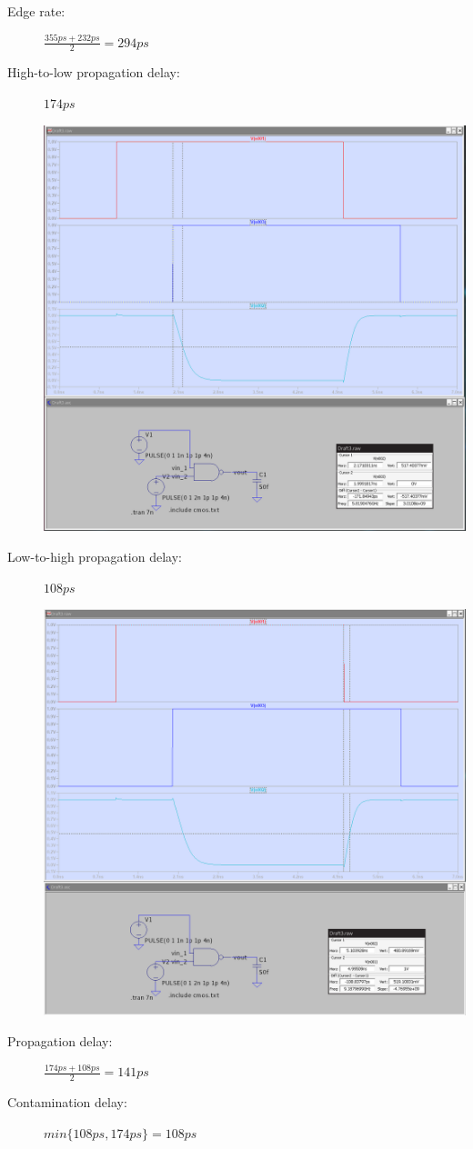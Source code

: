 \documentclass[a4paper, 11pt]{article}
\begin{document}
\begin{description}
\begin{center}
	      \end{center}
	\item[Edge rate:] $\frac{355ps + 232ps}{2} = 294ps$
	\item[High-to-low propagation delay:] $174ps$ \hfill
	      \begin{center}
		      \includegraphics[scale=0.25]{images/high_to_low.png}
	      \end{center}
	\item[Low-to-high propagation delay:] $108ps$ \hfill
	      \begin{center}
		      \includegraphics[scale=0.25]{images/low_to_high.png}
	      \end{center}
	\item[Propagation delay:] $\frac{174ps + 108ps}{2} = 141ps $
	\item[Contamination delay:] $ min\{108ps, 174ps\} = 108ps $
\end{description}
\end{document}
